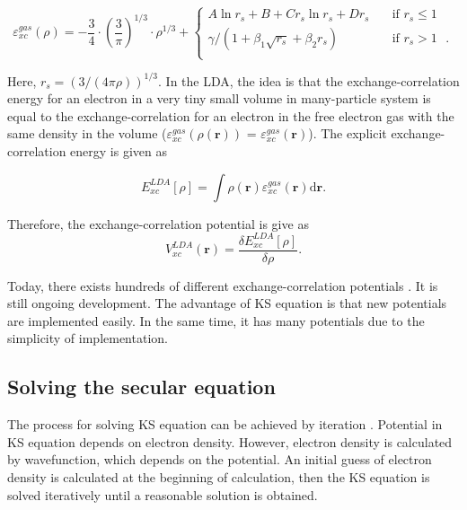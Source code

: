 \documentclass[a4paper, 12pt, titlepage,oneside,drop]{kthesis}
\begin{document}
\begin{equation} 
 \varepsilon_{xc}^{gas}(\rho) = -\frac{3}{4}\cdot(\frac{3}{\pi})^{1/3}\cdot{\rho}^{1/3} + 
 \begin{cases} A\ln{r_s}+B+C{r_s}\ln{r_s}+D{r_s} & \quad \mbox{if ${r_s} \leq 1 $} 
\\
 \gamma / (1+\beta_1 \sqrt{{r_s}}+ \beta_2 {r_s}) & \quad \mbox{if ${r_s} > 1$ }.\\ 
\end{cases} 
\end{equation}

Here, $r_s = (3 / (4 \pi \rho))^{1/3}$. In the LDA, the idea is that the exchange-correlation energy for an electron in a very tiny small volume in many-particle system is equal to the exchange-correlation for an electron 
in the free electron gas with the same density in the volume ($\varepsilon_{xc}^{gas}(\rho(\textbf{r}))$ = $\varepsilon_{xc}^{gas}(\textbf{r})$). The explicit exchange-correlation energy is given as

\begin{equation}
 E^{LDA}_{xc}[\rho] = \int \rho(\textbf{r}) \varepsilon_{xc}^{gas}( \textbf{r} ) \mathrm{d} \textbf{r}.
\end{equation}

Therefore, the exchange-correlation potential is give as
\begin{equation}
 V_{xc}^{LDA}(\textbf{r}) = \frac{\delta  E^{LDA}_{xc}[\rho]}{\delta \rho}.
\end{equation}

Today, there exists hundreds of different exchange-correlation potentials \cite{tozer1998development, hamprecht1998development, grabo1995density, cohen2007development}. It is still ongoing development.
The advantage of KS equation is that new potentials are implemented easily. In the same time, it has many potentials due to
the simplicity of implementation.

\subsection{Solving the secular equation}

The process for solving KS equation can be achieved by iteration \cite{martin2004electronic, Cottenierwien2k, clasdft}. Potential in KS equation depends on electron density.
However, electron density is calculated by wavefunction, which depends on the potential. 
An initial guess of electron density is calculated at the beginning of calculation, then the KS equation is solved iteratively until a reasonable solution is obtained.
\end{document}
